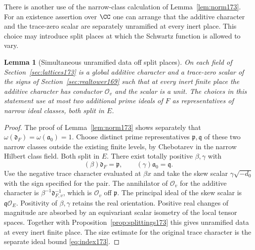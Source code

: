\documentclass[a4paper,11pt]{article}
\newtheorem{lemma}[proposition]{Lemma}
\theoremstyle{definition}
\theoremstyle{remark}
\numberwithin{equation}{section}
\newcommand{\OO}{\mathcal O}
\begin{document}
There is another use of the narrow-class calculation of
Lemma~\ref{lem:norm173}. For an existence assertion over
\(\CC\) one can arrange that the additive character and the
trace-zero scalar are separately unramified at every inert
place. This choice may introduce split places at which the
Schwartz function is allowed to vary.

\begin{lemma}[Simultaneous unramified data off split places]
\label{lem:good175}
On each field of Section~\ref{sec:lattices173} is a global
additive character and a trace-zero scalar of the signs of
Section~\ref{sec:realtower169} such that at every inert finite
place the additive character has conductor \(\OO_v\) and
the scalar is a unit. The choices in this statement use at
most two additional prime ideals of \(F\) as representatives
of narrow ideal classes, both split in \(E\).
\end{lemma}
\begin{proof}
The proof of Lemma~\ref{lem:norm173} shows separately that
\(\omega(\mathfrak d_F)=\omega(\mathfrak a_0)=1\).
Choose distinct prime representatives \(\mathfrak p,\mathfrak q\)
of these two narrow classes outside the existing finite levels,
by Chebotarev in the narrow Hilbert class field. Both split
in \(E\). There exist totally positive \(\beta,\gamma\) with
\[
        (\beta)\mathfrak d_F=\mathfrak p,\qquad
        (\gamma)\mathfrak a_0=\mathfrak q.
\]
Use the negative trace character evaluated at \(\beta x\)
and take the skew scalar \(\gamma\sqrt{-d_0}\) with the sign
specified for the pair. The annihilator of \(\OO_v\) for
the additive character is
\(\beta^{-1}\mathfrak d_{F,v}^{-1}\), which is \(\OO_v\)
off \(\mathfrak p\). The principal ideal of the skew scalar
is \(\mathfrak q\OO_E\). Positivity of \(\beta,\gamma\)
retains the real orientation. Positive real changes of
magnitude are absorbed by an equivariant scalar isometry
of the local tensor spaces. Together with
Proposition~\ref{prop:splittings173} this gives unramified
data at every inert finite place. The size estimate for
the original trace character is the separate ideal bound
\eqref{eq:index173}.
\end{proof}
\end{document}
